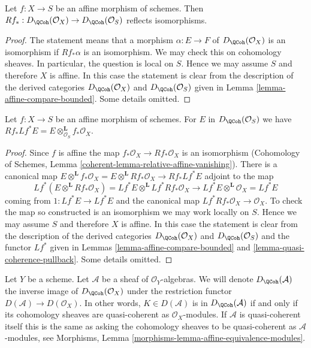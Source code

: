 \begin{lemma}
\label{lemma-affine-morphism}
Let $f : X \to S$ be an affine morphism of schemes.
Then
$Rf_* : D_\QCoh(\mathcal{O}_X) \to D_\QCoh(\mathcal{O}_S)$
reflects isomorphisms.
\end{lemma}

\begin{proof}
The statement means that a morphism $\alpha : E \to F$ of
$D_\QCoh(\mathcal{O}_X)$ is an isomorphism if
$Rf_*\alpha$ is an isomorphism. We may check this on cohomology sheaves.
In particular, the question is local on $S$. Hence we may assume $S$
and therefore $X$ is affine. In this case the statement is clear from
the description of the derived categories
$D_\QCoh(\mathcal{O}_X)$ and
$D_\QCoh(\mathcal{O}_S)$ given in
Lemma \ref{lemma-affine-compare-bounded}.
Some details omitted.
\end{proof}

\begin{lemma}
\label{lemma-affine-morphism-pull-push}
Let $f : X \to S$ be an affine morphism of schemes.
For $E$ in $D_\QCoh(\mathcal{O}_S)$ we have
$Rf_* Lf^* E = E \otimes^\mathbf{L}_{\mathcal{O}_S} f_*\mathcal{O}_X$.
\end{lemma}

\begin{proof}
Since $f$ is affine the map $f_*\mathcal{O}_X \to Rf_*\mathcal{O}_X$
is an isomorphism
(Cohomology of Schemes, Lemma \ref{coherent-lemma-relative-affine-vanishing}).
There is a canonical map $E \otimes^\mathbf{L} f_*\mathcal{O}_X =
E \otimes^\mathbf{L} Rf_*\mathcal{O}_X \to Rf_* Lf^* E$
adjoint to the map
$$
Lf^*(E \otimes^\mathbf{L} Rf_*\mathcal{O}_X) =
Lf^*E \otimes^\mathbf{L} Lf^*Rf_*\mathcal{O}_X \longrightarrow
Lf^* E \otimes^\mathbf{L} \mathcal{O}_X = Lf^* E
$$
coming from $1 : Lf^*E \to Lf^*E$ and the canonical map
$Lf^*Rf_*\mathcal{O}_X \to \mathcal{O}_X$. To check the map so constructed
is an isomorphism we may work locally on $S$. Hence we may assume
$S$ and therefore $X$ is affine. In this case the statement is clear from
the description of the derived categories
$D_\QCoh(\mathcal{O}_X)$ and
$D_\QCoh(\mathcal{O}_S)$ and the functor $Lf^*$ given in
Lemmas \ref{lemma-affine-compare-bounded} and
\ref{lemma-quasi-coherence-pullback}.
Some details omitted.
\end{proof}

\noindent
Let $Y$ be a scheme. Let $\mathcal{A}$ be a sheaf of $\mathcal{O}_Y$-algebras.
We will denote $D_\QCoh(\mathcal{A})$ the inverse image of
$D_\QCoh(\mathcal{O}_X)$ under the restriction functor
$D(\mathcal{A}) \to D(\mathcal{O}_X)$. In other words, $K \in D(\mathcal{A})$
is in $D_\QCoh(\mathcal{A})$ if and only if its cohomology sheaves are
quasi-coherent as $\mathcal{O}_X$-modules. If $\mathcal{A}$ is quasi-coherent
itself this is the same as asking the cohomology sheaves to be quasi-coherent
as $\mathcal{A}$-modules, see
Morphisms, Lemma \ref{morphisms-lemma-affine-equivalence-modules}.

